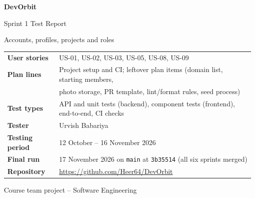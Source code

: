 \documentclass[11pt,a4paper]{article}
\begin{document}
\begin{titlepage}\centering\vspace*{2.5cm}
{\Huge\bfseries\color{accent} DevOrbit\par}\vspace{0.6cm}
{\LARGE Sprint 1 Test Report\par}\vspace{0.3cm}
{\Large Accounts, profiles, projects and roles\par}\vspace{1.5cm}
\begin{tabular}{>{\bfseries}l l}
User stories  & US-01, US-02, US-03, US-05, US-08, US-09 \\
Plan lines    & Project setup and CI; leftover plan items (domain list, starting members,\\
              & photo storage, PR template, lint/format rules, seed process) \\
Test types    & API and unit tests (backend), component tests (frontend), end-to-end, CI checks \\
Tester        & Urvish Babariya \\
Testing period & 12 October -- 16 November 2026 \\
Final run     & 17 November 2026 on \texttt{main} at \texttt{3b35514} (all six sprints merged) \\
Repository    & \url{https://github.com/Heer64/DevOrbit} \\
\end{tabular}\vfill{\small Course team project -- Software Engineering\par}
\end{titlepage}
\tableofcontents\newpage
\end{document}
